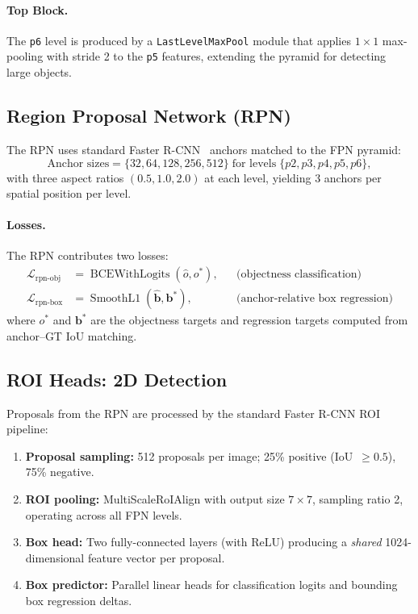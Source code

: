 \documentclass[runningheads]{llncs}
\newcommand{\op}[1]{\operatorname{#1}}
\newcommand{\mat}[1]{\bm{#1}}
\begin{document}
\paragraph{Top Block.}  The \texttt{p6} level is produced by a \texttt{LastLevelMaxPool} module that applies $1\times 1$ max-pooling with stride 2 to the \texttt{p5} features, extending the pyramid for detecting large objects.


\subsection{Region Proposal Network (RPN)}
\label{sec:rpn}

The RPN uses standard Faster R-CNN~\cite{ren2015faster} anchors matched to the FPN pyramid:
\begin{equation}
    \text{Anchor sizes} = \{32, 64, 128, 256, 512\} \;\text{for levels}\; \{p2, p3, p4, p5, p6\},
    \label{eq:anchors}
\end{equation}
with three aspect ratios $(0.5, 1.0, 2.0)$ at each level, yielding $3$ anchors per spatial position per level.

\paragraph{Losses.}  The RPN contributes two losses:
\begin{align}
    \mathcal{L}_{\text{rpn-obj}} &= \op{BCEWithLogits}(\hat{o}, o^*), & &\text{(objectness classification)} \label{eq:rpn_obj} \\
    \mathcal{L}_{\text{rpn-box}} &= \op{SmoothL1}(\hat{\mat{b}}, \mat{b}^*), & &\text{(anchor-relative box regression)} \label{eq:rpn_box}
\end{align}
where $o^*$ and $\mat{b}^*$ are the objectness targets and regression targets computed from anchor--GT IoU matching.


\subsection{ROI Heads: 2D Detection}
\label{sec:roi_heads}

Proposals from the RPN are processed by the standard Faster R-CNN ROI pipeline:
\begin{enumerate}
    \item \textbf{Proposal sampling:} 512 proposals per image; 25\% positive (IoU~$\geq 0.5$), 75\% negative.
    \item \textbf{ROI pooling:} MultiScaleRoIAlign with output size $7 \times 7$, sampling ratio 2, operating across all FPN levels.
    \item \textbf{Box head:} Two fully-connected layers (with ReLU) producing a \emph{shared} 1024-dimensional feature vector per proposal.
    \item \textbf{Box predictor:} Parallel linear heads for classification logits and bounding box regression deltas.
\end{enumerate}
\end{document}
